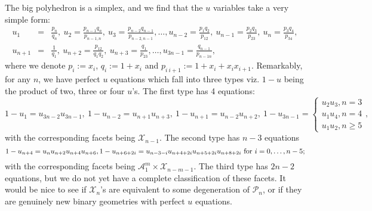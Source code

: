 \documentclass[hidelinks,12pt]{article}
\newcommand{\bea}[1]{\begin{eqnarray}\label{#1} }
\newcommand{\eea}{\end{eqnarray}}
\def\bea{\begin{eqnarray}}
\def\eea{\end{eqnarray}}
\begin{document}
The big polyhedron is a simplex, and we find that the $u$ variables take a very simple form:
\bea
u_1 &=& \frac{p_n}{q_n}, ~u_2 = \frac{p_{n-1}q_n}{p_{n-1,n}},~u_3 = \frac{p_{n-2}q_{n-1}}{p_{n-2,n-1}}, \dots,
u_{n-2} = \frac{p_1 q_2}{p_{12}}, ~u_{n-1} = \frac{p_{2}q_3}{p_{23}},~u_n = \frac{p_{3}q_{4}}{p_{34}}, \nonumber \\
u_{n+1} &=& \frac{1}{q_1}, ~u_{n+2} = \frac{p_{12}}{q_{1}q_{2}},~u_{n+3} = \frac{q_{1}}{p_{23}}, \dots,
u_{3n-1} = \frac{ q_{n-1}}{p_{n-1n}} ,
\eea
where we denote $p_i :=x_i$, $q_i := 1+x_i$ and $p_{i~i+1}:=1+x_i+ x_i x_{i+1}$. Remarkably, for any $n$, we have perfect $u$ equations which fall into three types viz. $1-u$ being the product of two, three or four $u$'s. The first type has 4 equations:
\[
1-u_{1} =u_{3n-2} u_{3n-1},~
1-u_{n-2} =u_{n+1} u_{n+3},~
1-u_{n+1} =u_{n-2} u_{n+2},~
1-u_{3n-1} = \begin{cases}
u_{2} u_{3} , n=3\\
u_{1} u_{4} , n=4\\
u_{1} u_{2} , n\geq 5
\end{cases},
\]
with the corresponding facets being $\mathscr{X}_{n-1}$. The second type has $n-3$ equations
\[
1-u_{n+4} =u_{n} u_{n+2}u_{n+4} u_{n+6},
1-u_{n+6+2 i} =u_{n-3-i} u_{n+4+2 i} u_{n+5+2 i} u_{n+8+2 i}~ {\rm for}~i=0,\dots,n-5;
\]
with the corresponding facets being $\mathscr{A}^{m}_1 \times \mathscr{X}_{n-m-1}$. The third type has $2n-2$ equations, but we do not yet have a complete classification of these facets. It would be nice to see if $\mathscr{X}_n$'s are equivalent to some degeneration of $\mathscr{P}_n$, or if they are genuinely new binary geometries with perfect $u$ equations.  
%
%
%
%
\end{document}
